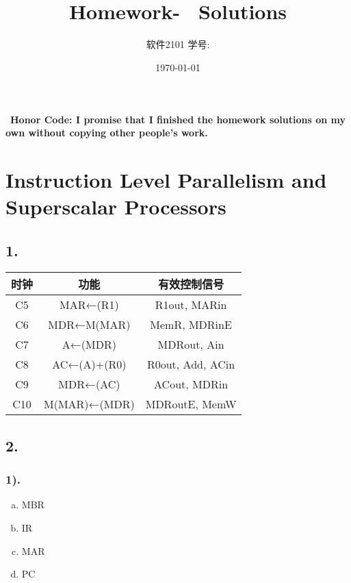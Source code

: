 \documentclass[11pt]{article}  %
\title{\vspace{-4cm}\CourseCodeName \space
        \Session \protect\\  Homework-~\textbf{\Homework} Solutions}
\author{软件2101 \Name \space 学号: \SID}
\date{\today}
\begin{document}
\maketitle

~\textbf{Honor Code: I promise that I finished the homework solutions on my own without copying other people's 
    work.}
    
\section*{Instruction Level Parallelism and Superscalar Processors}

\subsection*{1. }

\begin{table}[H]
    \begin{tabular}{|c|c|c|}
    \hline
    \textbf{时钟} & \textbf{功能}  & \textbf{有效控制信号}  \\ \hline
    C5          & MAR←(R1)     & R1out, MARin     \\ \hline
    C6          & MDR←M(MAR)   & MemR, MDRinE     \\ \hline
    C7          & A←(MDR)      & MDRout, Ain      \\ \hline
    C8          & AC←(A)+(R0)  & R0out, Add, ACin \\ \hline
    C9          & MDR←(AC)     & ACout, MDRin     \\ \hline
    C10         & M(MAR)←(MDR) & MDRoutE, MemW    \\ \hline
    \end{tabular}
\end{table}

\subsection*{2. }

\subsubsection*{1). }

\begin{enumerate}[a.]
    \item MBR
    \item IR
    \item MAR
    \item PC
\end{enumerate}
\end{document}
